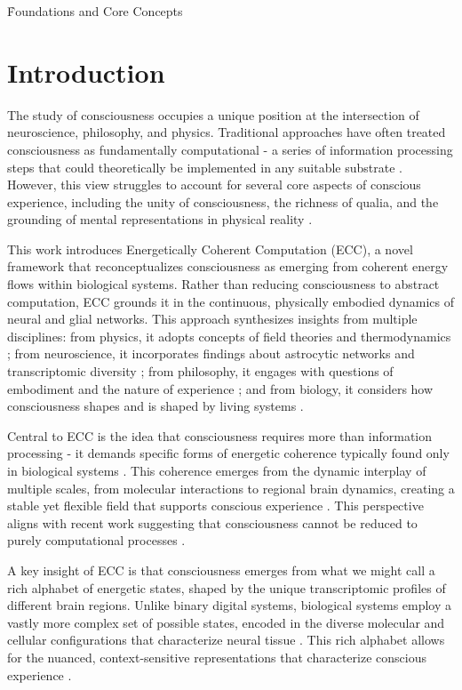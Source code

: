 \h{Foundations and Core Concepts}

\section{Introduction}

\begin{refsection}

The study of consciousness occupies a unique position at the intersection of neuroscience, philosophy, and physics. Traditional approaches have often treated consciousness as fundamentally computational - a series of information processing steps that could theoretically be implemented in any suitable substrate \cite{dennett1993consciousness}. However, this view struggles to account for several core aspects of conscious experience, including the unity of consciousness, the richness of qualia, and the grounding of mental representations in physical reality \cite{block1995confusion}.

This work introduces Energetically Coherent Computation (ECC), a novel framework that reconceptualizes consciousness as emerging from coherent energy flows within biological systems. Rather than reducing consciousness to abstract computation, ECC grounds it in the continuous, physically embodied dynamics of neural and glial networks. This approach synthesizes insights from multiple disciplines: from physics, it adopts concepts of field theories and thermodynamics \cite{prigogine2018order}; from neuroscience, it incorporates findings about astrocytic networks and transcriptomic diversity \cite{Giaume2010,Hawrylycz2012}; from philosophy, it engages with questions of embodiment and the nature of experience \cite{varela1991embodied}; and from biology, it considers how consciousness shapes and is shaped by living systems \cite{maturana1991autopoiesis}.

Central to ECC is the idea that consciousness requires more than information processing - it demands specific forms of energetic coherence typically found only in biological systems \cite{margulis2001conscious}. This coherence emerges from the dynamic interplay of multiple scales, from molecular interactions to regional brain dynamics, creating a stable yet flexible field that supports conscious experience \cite{thompson2010mind}. This perspective aligns with recent work suggesting that consciousness cannot be reduced to purely computational processes \cite{seth2024conscious}.

A key insight of ECC is that consciousness emerges from what we might call a rich alphabet of energetic states, shaped by the unique transcriptomic profiles of different brain regions. Unlike binary digital systems, biological systems employ a vastly more complex set of possible states, encoded in the diverse molecular and cellular configurations that characterize neural tissue \cite{levin2019computational}. This rich alphabet allows for the nuanced, context-sensitive representations that characterize conscious experience \cite{seth2021being,juarrero2023context}.


\end{refsection}
